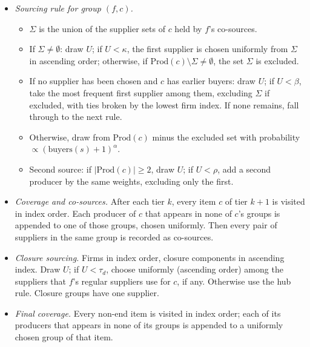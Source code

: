 \documentclass{ifacconf}
\begin{document}
\begin{itemize}
\item \emph{Sourcing rule for group $(f,c)$.}
  \begin{itemize}
  \item $\Sigma$ is the union of the supplier sets of $c$ held by $f$'s co-sources.
  \item If $\Sigma\neq\emptyset$: draw $U$; if $U<\kappa$, the first supplier is chosen uniformly from $\Sigma$ in ascending order; otherwise, if $\mathrm{Prod}(c)\setminus\Sigma\neq\emptyset$, the set $\Sigma$ is excluded.
  \item If no supplier has been chosen and $c$ has earlier buyers: draw $U$; if $U<\beta$, take the most frequent first supplier among them, excluding $\Sigma$ if excluded, with ties broken by the lowest firm index. If none remains, fall through to the next rule.
  \item Otherwise, draw from $\mathrm{Prod}(c)$ minus the excluded set with probability $\propto(\mathrm{buyers}(s)+1)^{\alpha}$.
  \item Second source: if $|\mathrm{Prod}(c)|\ge2$, draw $U$; if $U<\rho$, add a second producer by the same weights, excluding only the first.
  \end{itemize}
\item \emph{Coverage and co-sources.} After each tier $k$, every item $c$ of tier $k{+}1$ is visited in index order. Each producer of $c$ that appears in none of $c$'s groups is appended to one of those groups, chosen uniformly. Then every pair of suppliers in the same group is recorded as co-sources.
\item \emph{Closure sourcing.} Firms in index order, closure components in ascending index. Draw $U$; if $U<\tau_d$, choose uniformly (ascending order) among the suppliers that $f$'s regular suppliers use for $c$, if any. Otherwise use the hub rule. Closure groups have one supplier.
\item \emph{Final coverage.} Every non-end item is visited in index order; each of its producers that appears in none of its groups is appended to a uniformly chosen group of that item.
\end{itemize}
\end{document}
